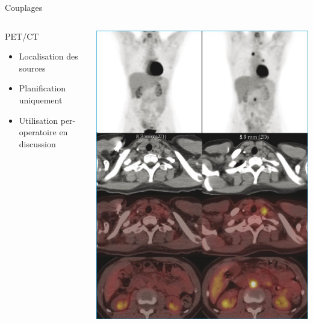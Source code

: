 \documentclass{beamer}
\begin{document}
\begin{frame}{Couplages}
 \centering
  \begin{columns}[T]
 \begin{column}{0.5\textwidth}
\begin{block}{PET/CT}
\begin{itemize}
 \item Localisation des sources
 \item Planification uniquement
 \item Utilisation per-operatoire en discussion
\end{itemize}
\end{block}
 \end{column}
 \begin{column}{0.5\textwidth}
\includegraphics[height=0.7\textheight]{images/pet_ct.jpg}
\end{column}
\end{columns}
\end{frame}
\end{document}

